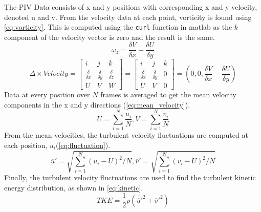 The PIV Data consists of \gls{x} and \gls{y} positions with corresponding x and y velocity, denoted \gls{u} and \gls{v}. From the velocity data at each point, vorticity is found using \autoref{eq:vorticity}. This is computed using the \verb|curl| function in \acrfull{matlab} as the $k$ component of the velocity vector is zero and the result is the same.
\begin{equation}\label{eq:vorticity}
    \omega _z = \frac{\delta V}{\delta x} - \frac{\delta U}{\delta y}
\end{equation}
\begin{equation}\label{eq:curl}
    \Delta \times Velocity = \begin{bmatrix} i & j & k \\ \frac{\delta}{\delta x} & \frac{\delta}{\delta y} & \frac{\delta}{\delta z} \\ U & V & W \end{bmatrix} = \begin{bmatrix} i & j & k \\ \frac{\delta}{\delta x} & \frac{\delta}{\delta y} & 0 \\ U & V & 0 \end{bmatrix} = (0,0,\frac{\delta V}{\delta x} - \frac{\delta U}{\delta y})
\end{equation}
Data at every position over $N$ frames is averaged to get the mean velocity components in the x and y directions (\autoref{eq:mean_velocity}). 
\begin{equation}\label{eq:mean_velocity}
    U = \sum^N_{i=1} \frac{u_i}{N}, V = \sum^N_{i=1} \frac{v_i}{N} 
\end{equation}
From the mean velocities, the turbulent velocity fluctuations are computed at each position, $u_i$(\autoref{eq:fluctuation}).
\begin{equation}\label{eq:fluctuation}
    \overline{u}' = \sqrt{\sum^N_{i=1}(u_i-U)^2/N},
    \overline{v}' = \sqrt{\sum^N_{i=1}(v_i-U)^2/N}
\end{equation}
Finally, the turbulent velocity fluctuations are used to find the turbulent kinetic energy distribution, as shown in \autoref{eq:kinetic}.
\begin{equation}\label{eq:kinetic}
    TKE = \frac{1}{2}\rho(\overline{u}'^2 + \overline{v}'^2)
\end{equation}

